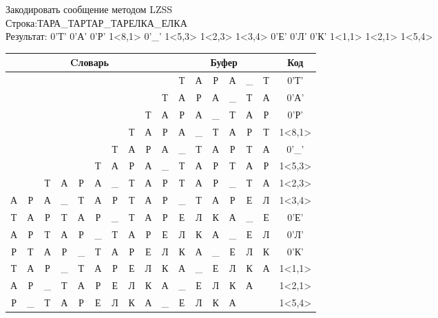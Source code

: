 \documentclass[a4paper, 12pt]{article}
\begin{document}
Закодировать сообщение методом LZSS\\
Строка:ТАРА\_ТАРТАР\_ТАРЕЛКА\_ЕЛКА\\
Результат: 0'Т' 0'А' 0'Р' 1<8,1> 0'\_' 1<5,3> 1<2,3> 1<3,4> 0'Е' 0'Л' 0'К' 1<1,1> 1<2,1> 1<5,4>\\
\begin{table}[h!]
\centering
\begin{tabular}{|c|c|c|c|c|c|c|c|c|c|c|c|c|c|c|c|c|}
\hline
\multicolumn{10}{|c|}{Cловарь} & \multicolumn{6}{c|}{Буфер} & Код  \\ \hline
  &   &   &   &   &   &   &   &   &   & Т & А & Р & А & \_ & Т & 0'Т'\\ \hline
  &   &   &   &   &   &   &   &   & Т & А & Р & А & \_ & Т & А & 0'А'\\ \hline
  &   &   &   &   &   &   &   & Т & А & Р & А & \_ & Т & А & Р & 0'Р'\\ \hline
  &   &   &   &   &   &   & Т & \cellcolor[HTML]{FFFF00} А & Р & \cellcolor[HTML]{FFFF00} А & \_ & Т & А & Р & Т & 1<8,1>\\ \hline
  &   &   &   &   &   & Т & А & Р & А & \_ & Т & А & Р & Т & А & 0'\_'\\ \hline
  &   &   &   &   & \cellcolor[HTML]{FFFF00} Т & \cellcolor[HTML]{FFFF00} А & \cellcolor[HTML]{FFFF00} Р & А & \_ & \cellcolor[HTML]{FFFF00} Т & \cellcolor[HTML]{FFFF00} А & \cellcolor[HTML]{FFFF00} Р & Т & А & Р & 1<5,3>\\ \hline
  &   & \cellcolor[HTML]{FFFF00} Т & \cellcolor[HTML]{FFFF00} А & \cellcolor[HTML]{FFFF00} Р & А & \_ & Т & А & Р & \cellcolor[HTML]{FFFF00} Т & \cellcolor[HTML]{FFFF00} А & \cellcolor[HTML]{FFFF00} Р & \_ & Т & А & 1<2,3>\\ \hline
А & Р & А & \cellcolor[HTML]{FFFF00} \_ & \cellcolor[HTML]{FFFF00} Т & \cellcolor[HTML]{FFFF00} А & \cellcolor[HTML]{FFFF00} Р & Т & А & Р & \cellcolor[HTML]{FFFF00} \_ & \cellcolor[HTML]{FFFF00} Т & \cellcolor[HTML]{FFFF00} А & \cellcolor[HTML]{FFFF00} Р & Е & Л & 1<3,4>\\ \hline
Т & А & Р & Т & А & Р & \_ & Т & А & Р & Е & Л & К & А & \_ & Е & 0'Е'\\ \hline
А & Р & Т & А & Р & \_ & Т & А & Р & Е & Л & К & А & \_ & Е & Л & 0'Л'\\ \hline
Р & Т & А & Р & \_ & Т & А & Р & Е & Л & К & А & \_ & Е & Л & К & 0'К'\\ \hline
Т & \cellcolor[HTML]{FFFF00} А & Р & \_ & Т & А & Р & Е & Л & К & \cellcolor[HTML]{FFFF00} А & \_ & Е & Л & К & А & 1<1,1>\\ \hline
А & Р & \cellcolor[HTML]{FFFF00} \_ & Т & А & Р & Е & Л & К & А & \cellcolor[HTML]{FFFF00} \_ & Е & Л & К & А &   & 1<2,1>\\ \hline
Р & \_ & Т & А & Р & \cellcolor[HTML]{FFFF00} Е & \cellcolor[HTML]{FFFF00} Л & \cellcolor[HTML]{FFFF00} К & \cellcolor[HTML]{FFFF00} А & \_ & \cellcolor[HTML]{FFFF00} Е & \cellcolor[HTML]{FFFF00} Л & \cellcolor[HTML]{FFFF00} К & \cellcolor[HTML]{FFFF00} А &   &   & 1<5,4>\\ \hline
\end{tabular}
\end{table}
\end{document}
